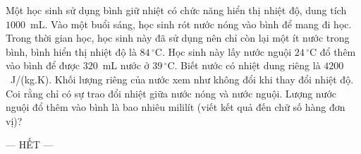 	\begin{ex}%
		Một học sinh sử dụng bình giữ nhiệt có chức năng hiển thị nhiệt độ, dung tích $1000$~mL. Vào một buổi sáng, học sinh rót nước nóng vào bình để mang đi học. Trong thời gian học, học sinh này đã sử dụng nên chỉ còn lại một ít nước trong bình, bình hiển thị nhiệt độ là $84\,^\circ\text{C}$. Học sinh này lấy nước nguội $24\,^\circ\text{C}$ đổ thêm vào bình để được $320$~mL nước ở $39\,^\circ\text{C}$. Biết nước có nhiệt dung riêng là $4200$~J/(kg.K). Khối lượng riêng của nước xem như không đổi khi thay đổi nhiệt độ. Coi rằng chỉ có sự trao đổi nhiệt giữa nước nóng và nước nguội. Lượng nước nguội đổ thêm vào bình là bao nhiêu mililít (viết kết quả đến chữ số hàng đơn vị)?
		\par
	\end{ex}

	\centerline{--- HẾT ---}


